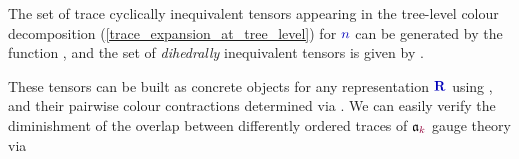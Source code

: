 \documentclass[12pt,a4paper]{article}\let\ifpdf\relax
\begin{document}
The set of trace cyclically inequivalent tensors appearing in the tree-level colour decomposition (\ref{trace_expansion_at_tree_level}) for $\b{n}$ can be generated by the function \mbox{,} and the set of \emph{dihedrally} inequivalent tensors is given by \mbox{.}

These tensors can be built as concrete  objects for any representation $\mathbf{\b{R}}$ using , and their pairwise colour contractions determined via . We can easily verify the diminishment of the overlap between differently ordered traces of $\mathfrak{a}_{\r{k}}$ gauge theory via
%
\end{document}

